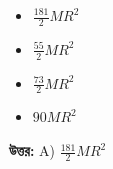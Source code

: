 \documentclass[12pt, a4paper]{article}
\begin{document}
\begin{itemize}[label={}, leftmargin=1cm, itemsep=0.5em]
    \item[\textbf{A)}]  $\frac{181}{2} M R^2$
    \item[\textbf{B)}]  $\frac{55}{2} M R^2$
    \item[\textbf{C)}]  $\frac{73}{2} M R^2$
    \item[\textbf{D)}]  $90 M R^2$
\end{itemize}

\vspace{0.5em}
\begin{tcolorbox}[answerbox]
    \textbf{\color{success} উত্তর:} A)  $\frac{181}{2} M R^2$
\end{tcolorbox}
\vspace{1em}
\end{document}
